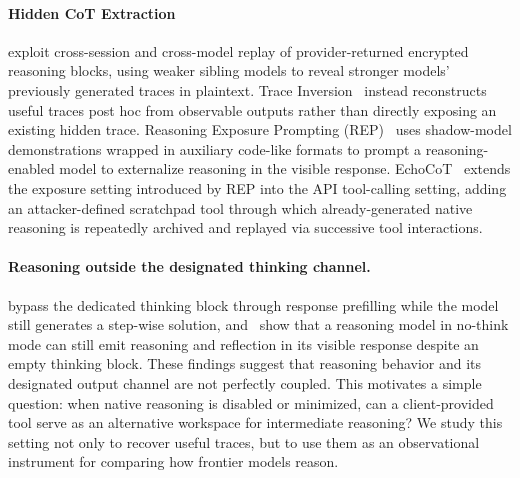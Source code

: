 \documentclass[10pt,letterpaper]{article}
\begin{document}
\paragraph{Hidden CoT Extraction}
\citet{panfilov2026stealing} exploit cross-session and cross-model replay of provider-returned encrypted reasoning blocks, using weaker sibling models to reveal stronger models' previously generated traces in plaintext.
Trace Inversion~\citep{zhang2026steal} instead reconstructs useful traces post hoc from observable outputs rather than directly exposing an existing hidden trace. Reasoning Exposure Prompting (REP)~\citep{lu2026hidden} uses shadow-model demonstrations wrapped in auxiliary code-like formats to prompt a reasoning-enabled model to externalize reasoning in the visible response.
EchoCoT~\citep{qu2026echocot} extends the exposure setting introduced by REP into the API tool-calling setting, adding an attacker-defined scratchpad tool through which already-generated native reasoning is repeatedly archived and replayed via successive tool interactions.


\paragraph{Reasoning outside the designated thinking channel.}

\citet{ma2025nothinking} bypass the dedicated thinking block through response prefilling while the model still generates a step-wise solution, and~\citet{wang2025hybridthinking} show that a reasoning model in no-think mode can still emit reasoning and reflection in its visible response despite an empty thinking block. These findings suggest that reasoning behavior and its designated output channel are not perfectly coupled. This motivates a simple question: when native reasoning is disabled or minimized, can a client-provided tool serve as an alternative workspace for intermediate reasoning? We study this setting not only to recover useful traces, but to use them as an observational instrument for comparing how frontier models reason.

\end{document}
